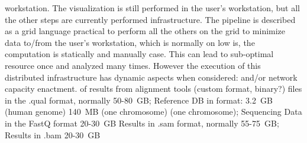 \documentclass[times]{cpeauth}
\begin{document}
%
workstation. The visualization is still performed in the user's %
workstation, but all the other steps are currently performed %
infrastructure. The pipeline is described as a grid %
language %
%
practical to perform all the others on the grid to minimize data %
to/from the user's workstation, which is normally on low %
is, the computation is statically and manually %
case. This can lead to sub-optimal resource %
%
%
once and analyzed many times. However the execution of this %
distributed infrastructure has dynamic aspects when %
considered:
%
and/or network capacity
enactment.
%
%
of results from alignment tools (custom format, binary?)
%
%
%
files in the .qual format, normally 50-80~GB; Reference DB in %
format: 3.2~GB (human genome) 140~MB (one chromosome)
%
(one chromosome); Sequencing Data in the FastQ format %
20-30~GB
%
Results in .sam format, normally 55-75~GB; Results in .bam %
20-30~GB
%
\end{document}
